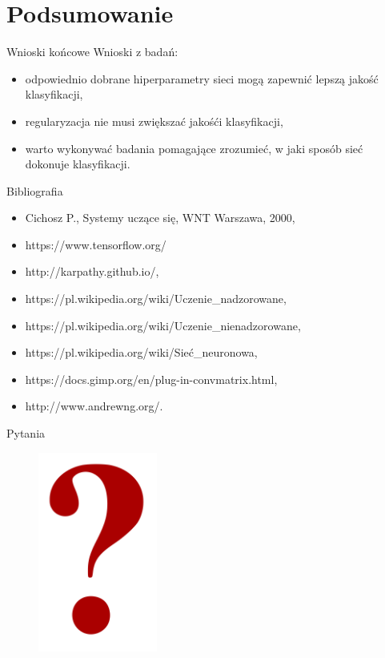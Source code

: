 \documentclass[xcolor=dvipsnames]{beamer}
\begin{document}
\section{Podsumowanie}
\begin{frame}{Wnioski końcowe}
  Wnioski z badań:
  \begin{itemize}
    \item odpowiednio dobrane hiperparametry sieci mogą zapewnić lepszą jakość klasyfikacji,
    \item regularyzacja nie musi zwiększać jakośći klasyfikacji,
    \item warto wykonywać badania pomagające zrozumieć, w jaki sposób sieć dokonuje klasyfikacji.
  \end{itemize}
\end{frame}
\begin{frame}{Bibliografia}
	\begin{itemize}
		\item Cichosz P., Systemy uczące się, WNT Warszawa, 2000,
		\item https://www.tensorflow.org/
		\item http://karpathy.github.io/,
		\item https://pl.wikipedia.org/wiki/Uczenie\_nadzorowane,
		\item https://pl.wikipedia.org/wiki/Uczenie\_nienadzorowane,
		\item https://pl.wikipedia.org/wiki/Sieć\_neuronowa,
		\item https://docs.gimp.org/en/plug-in-convmatrix.html,
		\item http://www.andrewng.org/.
	\end{itemize}
\end{frame}

\begin{frame}{Pytania}
  \begin{figure}
    \includegraphics[width=0.35\textwidth]{img/question-mark-red.png}
  \end{figure}
\end{frame}
\end{document}
